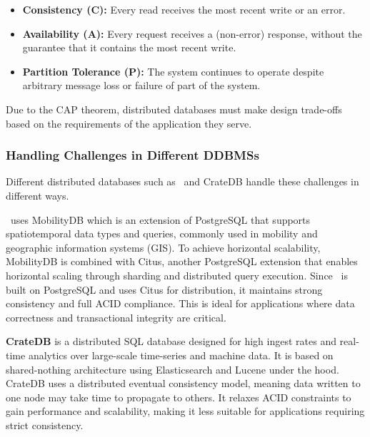 \begin{itemize}
	\item \textbf{Consistency (C):} Every read receives the most recent write or an error.
	\item \textbf{Availability (A):} Every request receives a (non-error) response, without the guarantee that it contains the most recent write.
	\item \textbf{Partition Tolerance (P):} The system continues to operate despite arbitrary message loss or failure of part of the system.
\end{itemize}

Due to the CAP theorem, distributed databases must make design trade-offs based on the requirements of the application they serve.

\subsubsection{Handling Challenges in Different DDBMSs}
Different distributed databases such as \mobilitydbc~and CrateDB handle these challenges in different ways.

\textbf{\mobilitydbc}~uses MobilityDB which is an extension of PostgreSQL that supports spatiotemporal data types and queries, commonly used in mobility and geographic information systems (GIS).
To achieve horizontal scalability, MobilityDB is combined with Citus, another PostgreSQL extension that enables horizontal scaling through sharding and distributed query execution.
Since \mobilitydbc~is built on PostgreSQL and uses Citus for distribution, it maintains strong consistency and full ACID compliance.
This is ideal for applications where data correctness and transactional integrity are critical.

\textbf{CrateDB} is a distributed SQL database designed for high ingest rates and real-time analytics over large-scale time-series and machine data.
It is based on shared-nothing architecture using Elasticsearch and Lucene under the hood.
CrateDB uses a distributed eventual consistency model, meaning data written to one node may take time to propagate to others.
It relaxes ACID constraints to gain performance and scalability, making it less suitable for applications requiring strict consistency.

